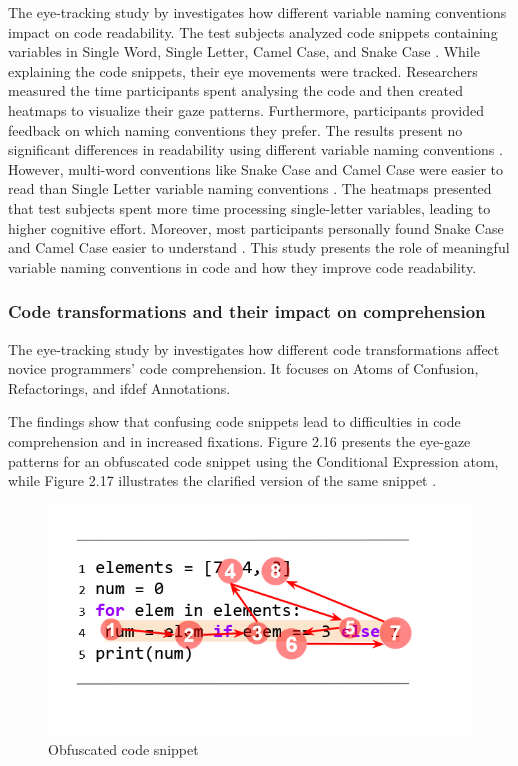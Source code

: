 The eye-tracking study by \citet{broberg2019using} investigates how different variable naming conventions impact on code readability.  
The test subjects analyzed code snippets containing variables in Single Word, Single Letter, Camel Case, and Snake Case \cite{broberg2019using}. While explaining the code snippets, their eye movements were tracked. Researchers measured the time participants spent analysing the code and then created heatmaps to visualize their gaze patterns. Furthermore, participants provided feedback on which naming conventions they prefer. The results present no significant differences in readability using different variable naming conventions \cite{broberg2019using}. However, multi-word conventions like Snake Case and Camel Case were easier to read than Single Letter variable naming conventions \cite{broberg2019using}. The heatmaps presented that test subjects spent more time processing single-letter variables, leading to higher cognitive effort. Moreover, most participants personally found Snake Case and Camel Case easier to understand \cite{broberg2019using}. 
This study presents the role of meaningful variable naming conventions in code and how they improve code readability.   

\subsubsection{Code transformations and their impact on comprehension}
The eye-tracking study by \citet{silva2023evaluating} investigates how different code transformations affect novice programmers’ code comprehension. It focuses on Atoms of Confusion, Refactorings, and ifdef Annotations. 

The findings show that confusing code snippets lead to difficulties in code comprehension and in increased fixations. Figure 2.16 presents the eye-gaze patterns for an obfuscated code snippet using the Conditional Expression atom, while Figure 2.17 illustrates the clarified version of the same snippet \cite{silva2023evaluating}. 
 

\begin{figure} [H]
  \centering
  \includegraphics[scale=0.8]{figures/a.png}
  \caption{Obfuscated code snippet \cite[p. 5]{silva2023evaluating}}
  \label{fig:AnhangsChor}
\end{figure}

